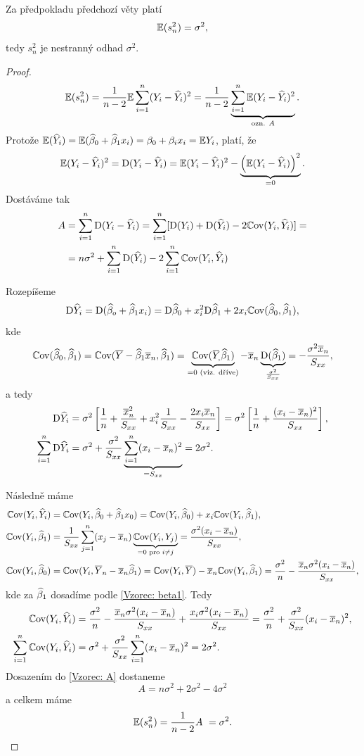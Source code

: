 \begin{theorem}
	Za předpokladu předchozí věty platí
	 $$
		\mathbb{E} (s_n^2) = \sigma^2,
	 $$
	tedy $s_n^2$ je nestranný odhad $\sigma^2$.
\end{theorem}


\begin{proof}
	 $$
		\mathbb{E}(s_n^2) = \frac{1}{n-2} \mathbb{E} \sum\limits_{i=1}^{n} (Y_i - \widehat{Y}_i)^2 = \frac{1}{n-2} \underbrace{\sum\limits_{i=1}^{n} \mathbb{E} (Y_i - \widehat{Y}_i)^2}_{\text{ozn. } A}.
	 $$
	Protože $\mathbb{E}(\widehat{Y}_i) = \mathbb{E}(\widehat{\beta}_0 + \widehat{\beta}_1 x_i) = \beta_0 + \beta_i x_i = \mathbb{E} Y_i$, platí, že
	 $$
	\mathbb{E}(Y_i - \widehat{Y}_i)^2 = \mathrm{D}(Y_i - \widehat{Y}_i) = \mathbb{E} (Y_i - \widehat{Y}_i)^2 - \underbrace{\left(\mathbb{E}(Y_i - \widehat{Y}_i)\right)^2}_{ = 0}.
	 $$
	Dostáváme tak	
	\begin{align}
		A & = \sum\limits_{i=1}^{n} \mathrm{D}(Y_i - \widehat{Y}_i) = \sum\limits_{i=1}^{n} [\mathrm{D}(Y_i) + \mathrm{D}(\widehat{Y}_i) - 2 \mathbb{C}\mathrm{ov}(Y_i, \widehat{Y}_i)] = \notag \\
		& = n \sigma^2 + \sum\limits_{i=1}^{n} \mathrm{D}(\widehat{Y}_i) - 2 \sum\limits_{i=1}^{n} \mathbb{C}\mathrm{ov}(Y_i, \widehat{Y}_i) \label{Vzorec: A}
	\end{align}
	
	Rozepíšeme
	 $$
		\mathrm{D} \widehat{Y}_i = \mathrm{D}(\widehat{\beta}_o + \widehat{\beta}_1 x_i) = \mathrm{D} \widehat{\beta}_0 + x_i^2 \mathrm{D} \widehat{\beta}_1 + 2 x_i \mathbb{C}\mathrm{ov} (\widehat{\beta}_0,\widehat{\beta}_1),
	 $$
	kde
	 $$
		\Cov(\wbeta_0, \wbeta_1) = \Cov(\lY  - \wbeta_1 \lxn, \wbeta_1) = \underbrace{\Cov(\oy, \wbeta_1)}_{ = 0 \text{ (viz. dříve)}} - \lxn \underbrace{\D(\wbeta_1)}_{\frac{\sigma^2}{\Sxx}} = -\frac{\sigma^2 \lxn}{\Sxx},
	 $$
	a tedy
	\begin{align*}
		\mathrm{D} \widehat{Y}_i & = \sigma^2 \left[\frac{1}{n} + \frac{\overline{x}_n^2}{S_{xx}} + x_i^2 \frac{1}{S_{xx}} - \frac{2 x_i \overline{x}_n}{S_{xx}} \right] = \sigma^2 \left[\frac{1}{n} + \frac{(x_i - \overline{x}_n)^2}{S_{xx}}\right], \\
		\sum\limits_{i=1}^{n} \mathrm{D} \widehat{Y}_i & = \sigma^2 + \frac{\sigma^2}{S_{xx}} \underbrace{\sum\limits_{i=1}^{n} (x_i - \overline{x}_n)^2}_{ = S_{xx}} = 2\sigma^2.
	\end{align*}
	
	Následně máme
	\begin{align*}
	\mathbb{C}\mathrm{ov}(Y_i, \widehat{Y}_i) & = \mathbb{C}\mathrm{ov}(Y_i, \widehat{\beta}_0 + \widehat{\beta}_1 x_0) = \mathbb{C}\mathrm{ov}(Y_i, \widehat{\beta}_0) + x_i \mathbb{C}\mathrm{ov}(Y_i, \widehat{\beta}_1), \\
	\mathbb{C}\mathrm{ov}(Y_i, \widehat{\beta}_1) & = \frac{1}{S_{xx}} \sum\limits_{j=1}^{n} (x_j - \overline{x}_n) \underbrace{\mathbb{C}\mathrm{ov}(Y_i, Y_j)}_{ = 0 \text{ pro~} i\neq j} = \frac{\sigma^2(x_i - \overline{x}_n)}{S_{xx}}, \\
	\mathbb{C}\mathrm{ov}(Y_i, \widehat{\beta}_0) & = \mathbb{C}\mathrm{ov}(Y_i, \overline{Y}_n - \overline{x}_n \widehat{\beta}_1) = \mathbb{C}\mathrm{ov}(Y_i, \overline{Y}) - \overline{x}_n \mathbb{C}\mathrm{ov}(Y_i, \widehat{\beta}_1) = \frac{\sigma^2}{n} - \frac{\overline{x}_n \sigma^2 (x_i - \overline{x}_n)}{S_{xx}}, 
	\end{align*}
	kde za $\widehat{\beta}_1$ dosadíme podle \eqref{Vzorec: beta1}. Tedy
	\begin{align*}
		\mathbb{C}\mathrm{ov}(Y_i, \widehat{Y}_i) & = \frac{\sigma^2}{n} - \frac{\overline{x}_n \sigma^2 (x_i - \overline{x}_n)}{S_{xx}} + \frac{x_i \sigma^2 (x_i - \overline{x}_n)}{S_{xx}} = \frac{\sigma^2}{n} + \frac{\sigma^2}{S_{xx}}(x_i - \overline{x}_n)^2, \\
		\sum\limits_{i=1}^{n} \mathbb{C}\mathrm{ov}(Y_i, \widehat{Y}_i) & = \sigma^2 + \frac{\sigma^2}{S_{xx}} \sum\limits_{i=1}^{n} (x_i - \overline{x}_n)^2 = 2 \sigma^2. 
	\end{align*}
	Dosazením do \eqref{Vzorec: A} dostaneme
	 $$
		A = n\sigma^2 + 2\sigma^2 - 4\sigma^2
	 $$
	a celkem máme
	 $$
		\mathbb{E}(s_n^2) = \frac{1}{n-2} A~ = \sigma^2.
	 $$
\end{proof}

